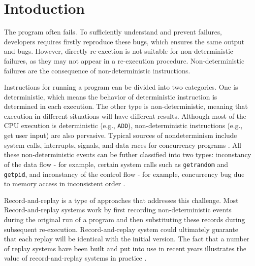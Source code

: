 \section{Intoduction} \label{sec:introduction}
The program often fails. To sufficiently understand and prevent failures,
developers requires firstly reproduce these bugs, which ensures the same output
and bugs. However, directly
re-exection is not suitable for non-deterministic failures, as they may not
appear in a re-execution procedure. Non-deterministic failures are the
consequence of non-deterministic instructions. 

Instructions for running a program can be divided into two categories. One is
deterministic, which means the behavior of deterministic instruction is determined in each
execution. The other type is non-deterministic, meaning that execution in
different situations will have different results. Although most of the CPU
execution is deterministic (e.g., \texttt{ADD}), non-deterministic instructions (e.g., get user input) are also pervasive.
Typical sources of nondeterminism include system calls, interrupts, signals, and
data races for concurrency programs \cite{ronsse_recplay_1999}. All these non-deterministic events can be futher classified into two types:
inconstancy of the data flow - for example, certain system calls such as
\texttt{getrandom} and \texttt{getpid}, and inconstancy of the control flow
- for example, concurrency bug due to memory access in inconsistent order \cite{getrandom2}.

Record-and-replay is a type of approaches that addresses this challenge. Most
Record-and-replay systems work by first recording non-deterministic events
during the original run of a program and then substituting these records during
subsequent re-execution. Record-and-replay system could ultimately guarante that
each replay will be identical with the initial version. The fact that a number
of replay systems have been built and put into use in recent years illustrates
the value of record-and-replay systems in practice \cite{203227,replay_survey,altekar_odr_2009,bhansali_framework_2006}.


